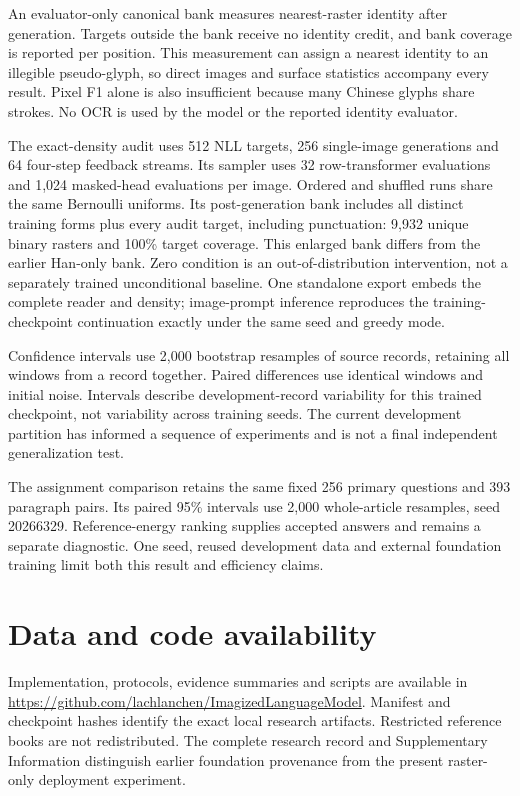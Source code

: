 \documentclass[12pt,a4paper]{article}
\begin{document}
An evaluator-only canonical bank measures nearest-raster identity after
generation. Targets outside the bank receive no identity credit, and bank
coverage is reported per position. This measurement can assign a nearest
identity to an illegible pseudo-glyph, so direct images and surface statistics
accompany every result. Pixel F1 alone is also insufficient because many
Chinese glyphs share strokes. No OCR is used by the model or the reported
identity evaluator.

The exact-density audit uses 512 NLL targets, 256 single-image generations and
64 four-step feedback streams. Its sampler uses 32 row-transformer evaluations
and 1,024 masked-head evaluations per image. Ordered and shuffled runs share
the same Bernoulli uniforms. Its post-generation bank includes all distinct
training forms plus every audit target, including punctuation: 9,932 unique
binary rasters and 100\% target coverage. This enlarged bank differs from the
earlier Han-only bank. Zero condition is an out-of-distribution intervention,
not a separately trained unconditional baseline. One standalone export embeds
the complete reader and density; image-prompt inference reproduces the
training-checkpoint continuation exactly under the same seed and greedy mode.

Confidence intervals use 2,000 bootstrap resamples of source records, retaining
all windows from a record together. Paired differences use identical windows
and initial noise. Intervals describe development-record variability for this
trained checkpoint, not variability across training seeds. The current
development partition has informed a sequence of experiments and is not a
final independent generalization test.

The assignment comparison retains the same fixed 256 primary questions and
393 paragraph pairs. Its paired 95\% intervals use 2,000 whole-article
resamples, seed 20266329. Reference-energy ranking supplies accepted answers
and remains a separate diagnostic. One seed, reused development data and
external foundation training limit both this result and efficiency claims.

\relax %
\section*{Data and code availability}
Implementation, protocols, evidence summaries and scripts are available in
\url{https://github.com/lachlanchen/ImagizedLanguageModel}. Manifest and
checkpoint hashes identify the exact local research artifacts. Restricted
reference books are not redistributed. The complete research record and
Supplementary Information distinguish earlier foundation provenance from the
present raster-only deployment experiment.
\end{document}
